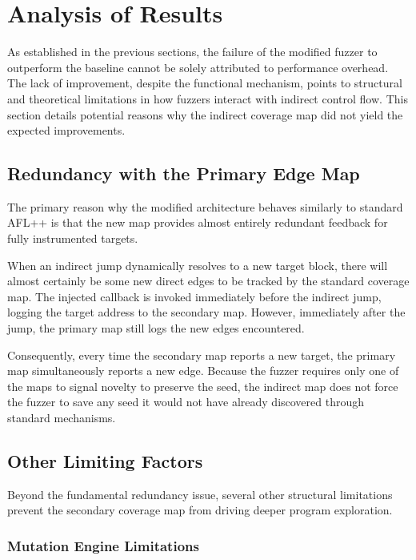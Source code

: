 \section{Analysis of Results}

As established in the previous sections, the failure of the modified fuzzer to outperform the baseline cannot be solely attributed to performance overhead. The lack of improvement, despite the functional mechanism, points to structural and theoretical limitations in how fuzzers interact with indirect control flow. This section details potential reasons why the indirect coverage map did not yield the expected improvements.

\subsection{Redundancy with the Primary Edge Map}

The primary reason why the modified architecture behaves similarly to standard AFL++ is that the new map provides almost entirely redundant feedback for fully instrumented targets. 

When an indirect jump dynamically resolves to a new target block, there will almost certainly be some new direct edges to be tracked by the standard coverage map. The injected callback is invoked immediately before the indirect jump, logging the target address to the secondary map. However, immediately after the jump, the primary map still logs the new edges encountered.

Consequently, every time the secondary map reports a new target, the primary map simultaneously reports a new edge. Because the fuzzer requires only one of the maps to signal novelty to preserve the seed, the indirect map does not force the fuzzer to save any seed it would not have already discovered through standard mechanisms.

\subsection{Other Limiting Factors}

Beyond the fundamental redundancy issue, several other structural limitations prevent the secondary coverage map from driving deeper program exploration.

\subsubsection{Mutation Engine Limitations}

